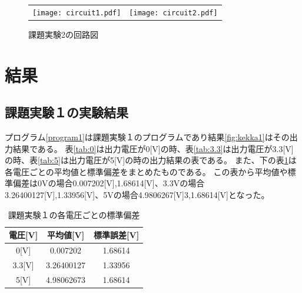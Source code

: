 \documentclass[11pt,dvipdfmx]{jarticle}
\begin{document}
		\newpage

				\begin{figure}[h]
					\begin{tabular}{cc}
						\begin{minipage}[c]{0.5\linewidth}
						\centering
						\texttt{[image: circuit1.pdf]}
						\caption{課題実験1の回路図}
						\label{fig:circuit1}
						
					\end{minipage}&
		
					\begin{minipage}[c]{0.5\linewidth}
						\centering
						\texttt{[image: circuit2.pdf]}
						\caption{課題実験2の回路図}
						\label{fig:circuit2}
						
					\end{minipage}

					\end{tabular}


				\end{figure}
					



\section{結果}
	\subsection{課題実験１の実験結果}
		プログラム\ref{program1}は課題実験１のプログラムであり結果\ref{fig:kekka1}はその出力結果である。
		表\ref{tab:0}は出力電圧が0[V]の時、表\ref{tab:3.3}は出力電圧が3.3[V]の時、表\ref{tab:5}は出力電圧が5[V]の時の出力結果の表である。
		また、下の表\ref{tab:hensa}は各電圧ごとの平均値と標準偏差をまとめたものである。
		この表から平均値や標準偏差は0Vの場合0.007202[V],1.68614[V]、3.3Vの場合3.26400127[V],1.33956[V]、5Vの場合4.9806267[V]3,1.68614[V]となった。

				

		\begin{table}[h]
			\caption{課題実験１の各電圧ごとの標準偏差}
			\centering
			\label{tab:hensa}
			\begin{tabular}{|c|c|c|}
				\hline
				電圧[V]	&	平均値[V]	&	標準誤差[V]\\
				\hline \hline
				0[V]		&0.007202&	1.68614\\
				\hline
				3.3[V]	&3.26400127&	1.33956\\
				\hline
				5[V]		&4.98062673&	1.68614\\
				\hline
			\end{tabular}
		\end{table}
		
\end{document}
